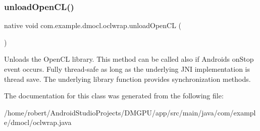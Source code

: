 \subsubsection{\texorpdfstring{unload\+Open\+C\+L()}{unloadOpenCL()}}
{\footnotesize\ttfamily native void com.\+example.\+dmocl.\+oclwrap.\+unload\+Open\+CL (\begin{DoxyParamCaption}{ }\end{DoxyParamCaption})}

Unloads the Open\+CL library. This method can be called also if Android\textquotesingle{}s \textquotesingle{}on\+Stop\textquotesingle{} event occurs.  Fully thread-\/safe as long as the underlying J\+NI implementation is thread save. The underlying library function provides synchronization methods. 

The documentation for this class was generated from the following file\+:\begin{DoxyCompactItemize}
\item 
/home/robert/\+Android\+Studio\+Projects/\+D\+M\+G\+P\+U/app/src/main/java/com/example/dmocl/oclwrap.\+java\end{DoxyCompactItemize}
